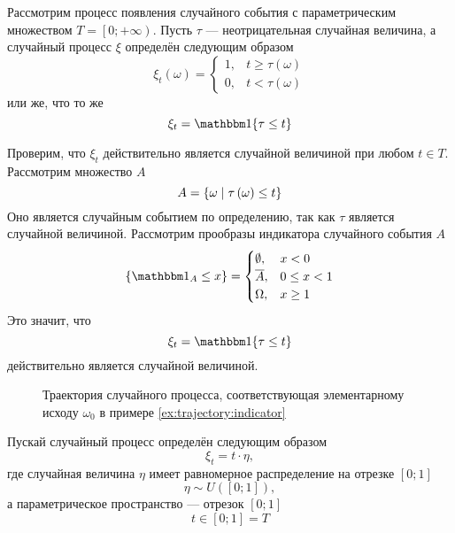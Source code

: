 \begin{example}\label{ex:trajectory:indicator}
  Рассмотрим процесс появления случайного события с параметрическим множеством
  $T = \left[ 0; +\infty \right)$.
  Пусть $\tau$ --- неотрицательная случайная величина, а случайный процесс $\xi$
  определён следующим образом
  \begin{equation*}
    \xi_t\left( \omega \right)
    = \begin{cases}
        1, &t \ge \tau\left( \omega \right) \\
        0, &t < \tau\left( \omega \right)
      \end{cases}
  \end{equation*}
  или же, что то же
  \begin{equation*}
    \xi_t = \Indicator{\tau \le t}
  \end{equation*}

  Проверим, что $\xi_t$ действительно является случайной величиной при любом
  $t \in T$.
  Рассмотрим множество $A$
  \begin{equation*}
    A = \left\{ \omega \;\middle|\; \tau\left( \omega \right) \le t \right\}
  \end{equation*}
  Оно является случайным событием по определению, так как $\tau$ является
  случайной величиной.
  Рассмотрим прообразы индикатора случайного события $A$
  \begin{equation*}
    \left\{ \indicatorof{A} \le x \right\}
    = \begin{cases}
      \emptyset, &x < 0 \\
      \stcomp{A}, &0 \le x < 1 \\
      \Omega, &x \ge 1
    \end{cases}
  \end{equation*}
  Это значит, что
  \begin{equation*}
    \xi_t = \Indicator{\tau \le t}
  \end{equation*}
  действительно является случайной величиной.
\end{example}
\begin{figure}[h!]
  \center
  \caption{Траектория случайного процесса, соответствующая элементарному
    исходу $\omega_0$ в примере \ref{ex:trajectory:indicator}}
  \label{fig:tikz:trajectory:indicator}
\end{figure}

\begin{example}\label{ex:trajectory:uniform}
  Пускай случайный процесс определён следующим образом
  \begin{equation*}
    \xi_t = t \cdot \eta,
  \end{equation*}
  где случайная величина $\eta$ имеет равномерное распределение на отрезке
  $\left[ 0; 1 \right]$
  \begin{equation*}
    \eta \sim U\left( \left[ 0; 1 \right] \right), 
  \end{equation*}
  а параметрическое пространство --- отрезок $\left[ 0; 1 \right]$
  \begin{equation*}
    t \in \left[ 0; 1 \right] = T
  \end{equation*}
\end{example}

